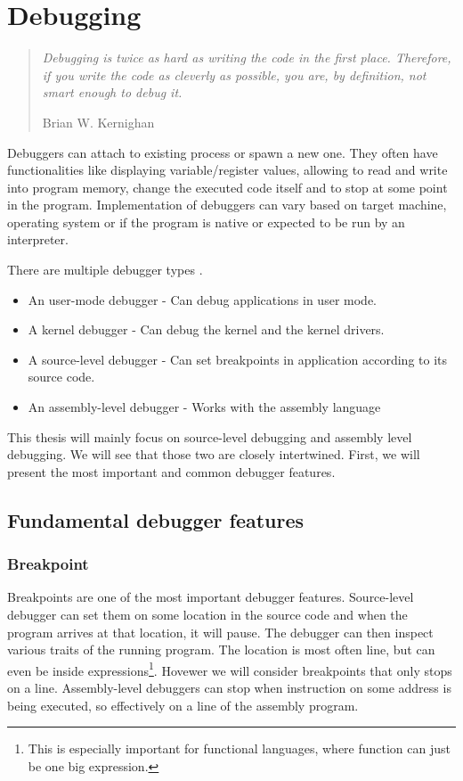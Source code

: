 \chapter{Debugging}

\begin{quote}
  \textit{Debugging is twice as hard as writing the code in the first place. Therefore, if you write the code as cleverly as possible, you are, by definition, not smart enough to debug it.}\begin{flushright}
    \tiny{Brian W. Kernighan}
  \end{flushright}
\end{quote}


Debuggers can attach to existing process or spawn a new one. They often have functionalities like displaying variable/register values, allowing to read and write into program memory, change the executed code itself and to stop at some point in the program. Implementation of debuggers can vary based on target machine, operating system or if the program is native or expected to be run by an interpreter.

There are multiple debugger types .
\begin{itemize}
    \item An user-mode debugger - Can debug applications in user mode.
    \item A kernel debugger - Can debug the kernel and the kernel drivers.
    \item A source-level debugger - Can set breakpoints in application according to its source code.
    \item An assembly-level debugger - Works with the assembly language
\end{itemize}

This thesis will mainly focus on source-level debugging and assembly level debugging. We will see that those two are closely intertwined. First, we will present the most important and common debugger features.

\section{Fundamental debugger features}
\subsection{Breakpoint}\label{breakpoint}
Breakpoints are one of the most important debugger features. Source-level debugger can set them on some location in the source code and when the program arrives at that location, it will pause. The debugger can then inspect various traits of the running program. The location is most often line, but can even be inside expressions\footnote{This is especially important for functional languages, where function can just be one big expression.}. Hovewer we will consider breakpoints that only stops on a line. Assembly-level debuggers can stop when instruction on some address is being executed, so effectively on a line of the assembly program.

